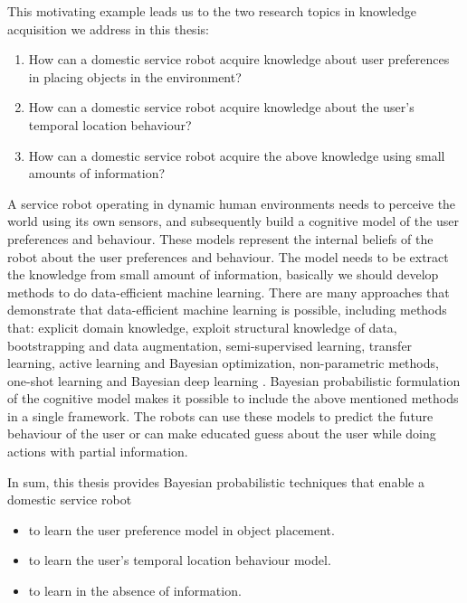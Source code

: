 \documentclass[11pt]{book}
\begin{document}
This motivating example leads us to the two research topics in knowledge acquisition we address in this thesis:
\begin{enumerate}
	\item How can a domestic service robot acquire knowledge about user preferences in placing objects in the environment?
	\item How can a domestic service robot acquire knowledge about the user's temporal location behaviour?
	\item How can a domestic service robot acquire the above knowledge using small amounts of information?
\end{enumerate}

A service robot operating in dynamic human environments needs to perceive the world using its own sensors, and subsequently build a cognitive model of the user preferences and behaviour. These models represent the internal beliefs of the robot about the user preferences and behaviour. The model needs to be extract the knowledge from small amount of information, basically we should develop methods to do data-efficient machine learning. There are many approaches that demonstrate that data-efficient machine learning is possible, including methods that: explicit domain knowledge, exploit structural knowledge of data, bootstrapping and data augmentation, semi-supervised learning, transfer learning, active learning and Bayesian optimization, non-parametric methods, one-shot learning and Bayesian deep learning \cite{https://sites.google.com/site/dataefficientml/home}. 
Bayesian probabilistic formulation of the cognitive model makes it possible to include the above mentioned methods in a single framework. The robots can use these models to predict the future behaviour of the user or can make educated guess about the user while doing actions with partial information.


In sum, this thesis provides Bayesian probabilistic techniques that enable a domestic service robot
\begin{itemize}
	\item to learn the user preference model in object placement.
	\item to learn the user's temporal location behaviour model.
	\item to learn in the absence of information.
\end{itemize}

\end{document}
